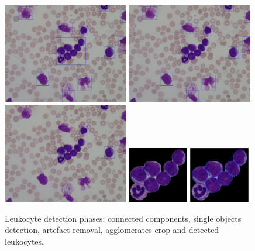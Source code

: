 \documentclass[final,a4paper,12pt,english]{UnicaPhdThesis3}
\begin{document}
\begin{figure}[!t]
	\centering
	\includegraphics[width=0.49\textwidth]{images/2016_1_mva/DetectedIm001_1}
	\includegraphics[width=0.49\textwidth]{images/2016_1_mva/DetectedIm001_1small}
	\includegraphics[width=0.49\textwidth]{images/2016_1_mva/DetectedIm001_1solid}
	\includegraphics[width=0.236\textwidth]{images/2016_1_mva/agglomerateclosed}
	\includegraphics[width=0.236\textwidth]{images/2016_1_mva/agglomeratehough}
	\caption{\label{fig:ex9}Leukocyte detection phases: connected components, single objects detection, artefact removal, agglomerates crop and detected leukocytes.}
\end{figure}
\end{document}
